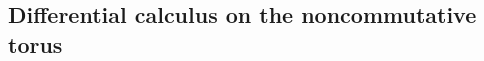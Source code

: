 \documentclass[
    aps,
    prb,
    twocolumn,
    floatfix,
    superscriptaddress,
	10pt
]{revtex4-2}
\begin{document}


\subsection{Differential calculus on the noncommutative torus}
\end{document}
